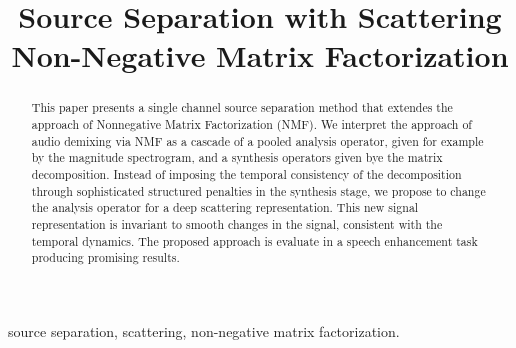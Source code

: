 \documentclass{article}
\title{Source Separation with Scattering Non-Negative Matrix Factorization}
\begin{document}
%
\maketitle
%
\begin{abstract}
This paper presents a single channel source separation method
that extendes the approach of Nonnegative Matrix Factorization (NMF).
We interpret the approach of audio demixing via NMF as a cascade of a pooled analysis operator, given
for example by the magnitude spectrogram, and a synthesis operators given bye the matrix decomposition.
Instead of imposing the temporal consistency of the decomposition through
sophisticated structured penalties in the synthesis stage,
we propose to change the analysis operator for a deep scattering representation. This new signal representation is
invariant to smooth changes in the signal, consistent with the temporal dynamics.
The proposed approach is evaluate in a speech enhancement task producing promising results.
\end{abstract}
%
\begin{keywords}
source separation, scattering, non-negative matrix factorization.
\end{keywords}
%









\end{document}
